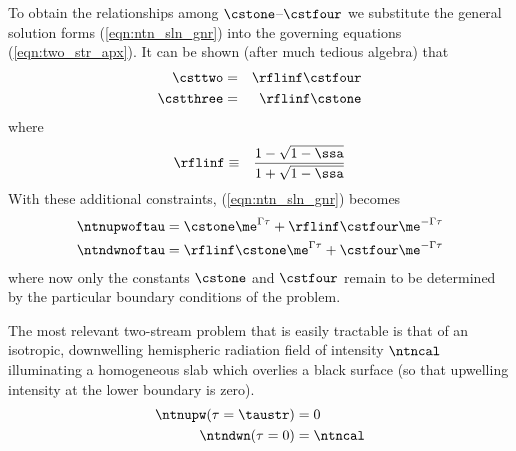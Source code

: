 \documentclass[12pt]{article}
\begin{document}
To obtain the relationships among $\cstone$--$\cstfour$ we substitute
the general solution forms (\ref{eqn:ntn_sln_gnr}) into the governing
equations (\ref{eqn:two_str_apx}). 
It can be shown (after much tedious algebra) that
\begin{eqnarray*}
\csttwo & = & \rflinf \cstfour \\
\cstthree & = & \rflinf \cstone
\label{eqn:cst_rlt}
\end{eqnarray*}
where 
\begin{eqnarray}
\rflinf & \equiv & \frac{1 - \sqrt{1 - \ssa}}{1 + \sqrt{1 - \ssa}}
\label{eqn:rfl_inf_dfn}
\end{eqnarray}
With these additional constraints, (\ref{eqn:ntn_sln_gnr}) becomes
\begin{subequations}
\label{eqn:ntn_sln_cns}
\begin{align}
\ntnupwoftau & = \cstone\me^{\Gamma\tau} + \rflinf\cstfour\me^{-\Gamma\tau} \\
\ntndwnoftau & = \rflinf\cstone\me^{\Gamma\tau} + \cstfour\me^{-\Gamma\tau} 
\end{align}
\end{subequations} 
where now only the constants $\cstone$ and $\cstfour$ remain to be
determined by the particular boundary conditions of the problem.

The most relevant two-stream problem that is easily tractable is that of an 
isotropic, downwelling hemispheric radiation field of intensity
$\ntncal$ illuminating a homogeneous slab which overlies a black
surface (so that upwelling intensity at the lower boundary is zero).
\begin{subequations}
\label{eqn:two_str_bc}
\begin{align}
\ntnupw(\tau = \taustr) & = 0 \\
\ntndwn(\tau = 0) & = \ntncal 
\end{align}
\end{subequations} 
\end{document}
